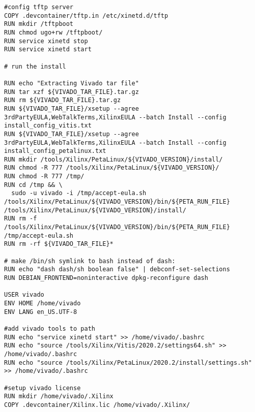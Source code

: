 \begin{lstlisting}[language=docker, breaklines=true, caption={Dockerfile for EDF Development Container}, label=lst:Dockerfile]
#config tftp server
COPY .devcontainer/tftp.in /etc/xinetd.d/tftp
RUN mkdir /tftpboot
RUN chmod ugo+rw /tftpboot/
RUN service xinetd stop
RUN service xinetd start

# run the install

RUN echo "Extracting Vivado tar file" 
RUN tar xzf ${VIVADO_TAR_FILE}.tar.gz 
RUN rm ${VIVADO_TAR_FILE}.tar.gz
RUN ${VIVADO_TAR_FILE}/xsetup --agree 3rdPartyEULA,WebTalkTerms,XilinxEULA --batch Install --config install_config_vitis.txt 
RUN ${VIVADO_TAR_FILE}/xsetup --agree 3rdPartyEULA,WebTalkTerms,XilinxEULA --batch Install --config install_config_petalinux.txt
RUN mkdir /tools/Xilinx/PetaLinux/${VIVADO_VERSION}/install/
RUN chmod -R 777 /tools/Xilinx/PetaLinux/${VIVADO_VERSION}/
RUN chmod -R 777 /tmp/
RUN cd /tmp && \
  sudo -u vivado -i /tmp/accept-eula.sh /tools/Xilinx/PetaLinux/${VIVADO_VERSION}/bin/${PETA_RUN_FILE} /tools/Xilinx/PetaLinux/${VIVADO_VERSION}/install/
RUN rm -f /tools/Xilinx/PetaLinux/${VIVADO_VERSION}/bin/${PETA_RUN_FILE} /tmp/accept-eula.sh
RUN rm -rf ${VIVADO_TAR_FILE}*

# make /bin/sh symlink to bash instead of dash:
RUN echo "dash dash/sh boolean false" | debconf-set-selections
RUN DEBIAN_FRONTEND=noninteractive dpkg-reconfigure dash

USER vivado
ENV HOME /home/vivado
ENV LANG en_US.UTF-8

#add vivado tools to path
RUN echo "service xinetd start" >> /home/vivado/.bashrc
RUN echo "source /tools/Xilinx/Vitis/2020.2/settings64.sh" >> /home/vivado/.bashrc
RUN echo "source /tools/Xilinx/PetaLinux/2020.2/install/settings.sh" >> /home/vivado/.bashrc

#setup vivado license
RUN mkdir /home/vivado/.Xilinx
COPY .devcontainer/Xilinx.lic /home/vivado/.Xilinx/
\end{lstlisting}